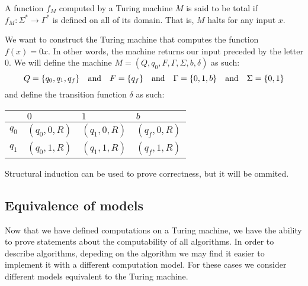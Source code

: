 \documentclass[11pt,a4paper]{article}
\begin{document}
  \begin{definition}
    A function $f_M$ computed by a Turing machine $M$ is said to be
    total if $f_M \colon \Sigma^* \to \Gamma^*$ is defined on all of
    its domain. That is, $M$ halts for any input $x$.
  \end{definition}

  \begin{example}
    We want to construct the Turing machine that computes the function
    $f(x) = 0x$.
    In other words, the machine returns our input preceded by the letter $0$.
    We will define the machine $M = (Q,q_0,F,\Gamma,\Sigma,b,\delta)$ as
    such:
    \[
      Q = \{q_0,q_1,q_f\} \quad \text{and} \quad
      F = \{q_f\} \quad \text{and} \quad
      \Gamma = \{0,1,b\} \quad \text{and} \quad
      \Sigma = \{0,1\}
    \]
    and define the transition function $\delta$ as such:
    \begin{center}
      \begin{tabular}{|l|l|l|l|}
        \hline
              & $0$         & $1$         & $b$         \\ \hline
        $q_0$ & $(q_0,0,R)$ & $(q_1,0,R)$ & $(q_f,0,R)$ \\ \hline
        $q_1$ & $(q_0,1,R)$ & $(q_1,1,R)$ & $(q_f,1,R)$ \\ \hline
      \end{tabular}
    \end{center}
    Structural induction can be used to prove correctness, but it will
    be ommited.
  \end{example}

  \subsection{Equivalence of models}
  Now that we have defined computations on a Turing machine, we have the
  ability to prove statements about the computability of all algorithms.
  In order to describe algorithms, depeding on the algorithm we may find
  it easier to implement it with a different computation model.
  For these cases we consider different models equivalent to the Turing
  machine.
\end{document}
